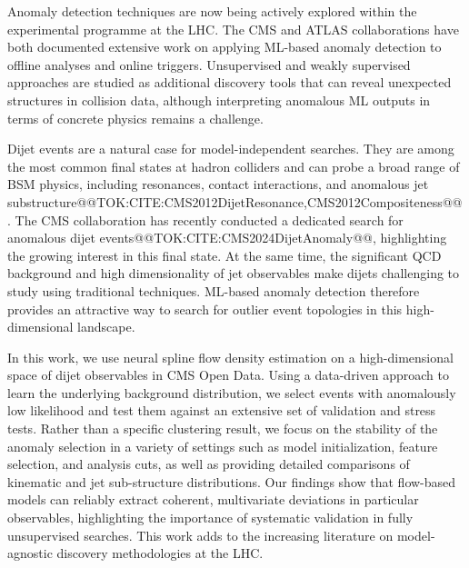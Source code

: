 \documentclass[11pt]{article}
\begin{document}
Anomaly detection techniques are now being actively explored within the experimental programme at the LHC. The CMS and ATLAS collaborations have both documented extensive work on applying ML-based anomaly detection to offline analyses and online triggers. Unsupervised and weakly supervised approaches are studied as additional discovery tools that can reveal unexpected structures in collision data, although interpreting anomalous ML outputs in terms of concrete physics remains a challenge.

Dijet events are a natural case for model-independent searches. They are among the most common final states at hadron colliders and can probe a broad range of BSM physics, including resonances, contact interactions, and anomalous jet substructure@@TOK:CITE:CMS2012DijetResonance,CMS2012Compositeness@@. The CMS collaboration has recently conducted a dedicated search for anomalous dijet events@@TOK:CITE:CMS2024DijetAnomaly@@, highlighting the growing interest in this final state. At the same time, the significant QCD background and high dimensionality of jet observables make dijets challenging to study using traditional techniques. ML-based anomaly detection therefore provides an attractive way to search for outlier event topologies in this high-dimensional landscape.

In this work, we use neural spline flow density estimation on a high-dimensional space of dijet observables in CMS Open Data. Using a data-driven approach to learn the underlying background distribution, we select events with anomalously low likelihood and test them against an extensive set of validation and stress tests. Rather than a specific clustering result, we focus on the stability of the anomaly selection in a variety of settings such as model initialization, feature selection, and analysis cuts, as well as providing detailed comparisons of kinematic and jet sub-structure distributions. Our findings show that flow-based models can reliably extract coherent, multivariate deviations in particular observables, highlighting the importance of systematic validation in fully unsupervised searches. This work adds to the increasing literature on model-agnostic discovery methodologies at the LHC.
\end{document}
